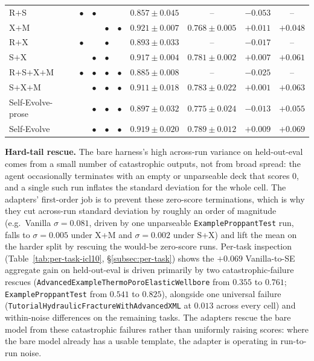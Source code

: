 \documentclass{article}
\begin{document}
\begin{table}[t]
{\begin{tabular}{l|cccc|cccc}
    R$+$S          & $\bullet$ & $\bullet$ &         &         & $0.857 \pm 0.045$           & --                           & $-0.053$          & --                \\
    X$+$M          &         &         & $\bullet$ & $\bullet$ & $\mathbf{0.921 \pm 0.007}$  & $0.768 \pm 0.005$            & $\mathbf{+0.011}$ & $+0.048$          \\
    R$+$X          & $\bullet$ &         & $\bullet$ &         & $0.893 \pm 0.033$           & --                           & $-0.017$          & --                \\
    S$+$X          &         & $\bullet$ & $\bullet$ &         & $0.917 \pm 0.004$           & $0.781 \pm \mathbf{0.002}$   & $+0.007$          & $+0.061$          \\
    R$+$S$+$X$+$M  & $\bullet$ & $\bullet$ & $\bullet$ & $\bullet$ & $0.885 \pm 0.008$           & --                           & $-0.025$          & --                \\
    \midrule
    S$+$X$+$M      &         & $\bullet$ & $\bullet$ & $\bullet$ & $0.911 \pm 0.018$           & $0.783 \pm 0.022$            & $+0.001$          & $+0.063$          \\
    Self-Evolve-prose &      & $\bullet$ & $\bullet$ & $\bullet$ & $0.897 \pm 0.032$           & $0.775 \pm 0.024$            & $-0.013$          & $+0.055$          \\
    Self-Evolve    &         & $\bullet$ & $\bullet$ & $\bullet$ & $0.919 \pm 0.020$           & $\mathbf{0.789 \pm 0.012}$   & $+0.009$          & $\mathbf{+0.069}$ \\
    \bottomrule
  \end{tabular}}
\end{table}

\textbf{Hard-tail rescue.} The bare harness's high across-run variance on held-out-eval comes from a small number of catastrophic outputs, not from broad spread: the agent occasionally terminates with an empty or unparseable deck that scores 0, and a single such run inflates the standard deviation for the whole cell. The adapters' first-order job is to prevent these zero-score terminations, which is why they cut across-run standard deviation by roughly an order of magnitude (e.g.\ Vanilla $\sigma = 0.081$, driven by one unparseable \texttt{ExampleProppantTest} run, falls to $\sigma = 0.005$ under X+M and $\sigma = 0.002$ under S+X) and lift the mean on the harder split by rescuing the would-be zero-score runs. Per-task inspection (Table~\ref{tab:per-task-icl10}, \S\ref{subsec:per-task}) shows the $+0.069$ Vanilla-to-SE aggregate gain on held-out-eval is driven primarily by two catastrophic-failure rescues (\texttt{AdvancedExampleThermoPoroElasticWellbore} from $0.355$ to $0.761$; \texttt{ExampleProppantTest} from $0.541$ to $0.825$), alongside one universal failure (\texttt{TutorialHydraulicFractureWithAdvancedXML} at $0.013$ across every cell) and within-noise differences on the remaining tasks. The adapters rescue the bare model from these catastrophic failures rather than uniformly raising scores: where the bare model already has a usable template, the adapter is operating in run-to-run noise.
\end{document}
